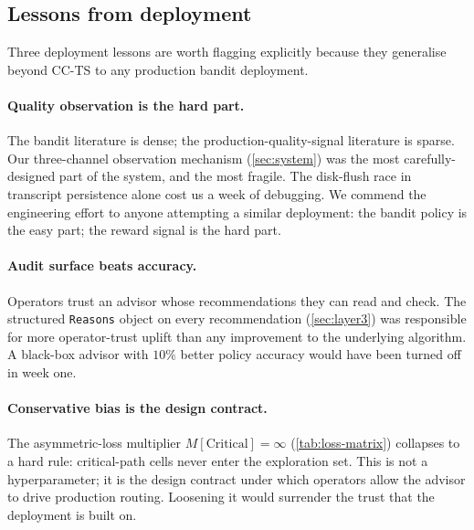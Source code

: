 \subsection{Lessons from deployment}

Three deployment lessons are worth flagging explicitly because they
generalise beyond CC-TS to any production bandit deployment.

\paragraph{Quality observation is the hard part.}
The bandit literature is dense; the production-quality-signal literature is
sparse. Our three-channel observation mechanism (\cref{sec:system}) was
the most carefully-designed part of the system, and the most fragile. The
disk-flush race in transcript persistence \cite{blackrim_hyqd} alone cost
us a week of debugging. We commend the engineering effort to anyone
attempting a similar deployment: the bandit policy is the easy part; the
reward signal is the hard part.

\paragraph{Audit surface beats accuracy.}
Operators trust an advisor whose recommendations they can read and check.
The structured \texttt{Reasons} object on every recommendation
(\cref{sec:layer3}) was responsible for more operator-trust uplift than
any improvement to the underlying algorithm. A black-box advisor with
$10\%$ better policy accuracy would have been turned off in week one.

\paragraph{Conservative bias is the design contract.}
The asymmetric-loss multiplier $M[\text{Critical}] = \infty$
(\cref{tab:loss-matrix}) collapses to a hard rule: critical-path cells
never enter the exploration set. This is not a hyperparameter; it is the
design contract under which operators allow the advisor to drive
production routing. Loosening it would surrender the trust that the
deployment is built on.
